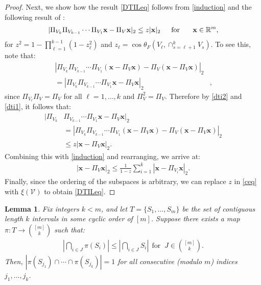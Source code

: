\documentclass[journal, twocolumn]{IEEEtran}
\newtheorem{lemma}{Lemma}
\begin{document}
\begin{proof}
Next, we show how the result \eqref{DTILeq} follows from \eqref{induction} and the following result of \cite[Theorem 9.33]{Deutsch12}:
\begin{align}\label{dti2}
|\Pi_{V_k}\Pi_{V_{k-1}}\cdots\Pi_{V_1} \mathbf{x} - \Pi_V\mathbf{x}|_2 \leq z |\mathbf{x}|_2 \indent \text{for } \indent \mathbf{x} \in \mathbb{R}^m,
\end{align}
for \mbox{$z^2= 1 - \prod_{\ell =1}^{k-1}(1-z_{\ell}^2)$} and \mbox{$z_{\ell} = \cos\theta_F\left(V_{\ell}, \cap_{s=\ell+1}^k V_s\right)$}. 
To see this, note that:
\begin{align}\label{dti1}
|\Pi_{V_k}\Pi_{V_{k-1}}\cdots\Pi_{V_1}(\mathbf{x} - \Pi_V\mathbf{x}) - \Pi_V(\mathbf{x} - \Pi_V\mathbf{x})|_2& \\
= |\Pi_{V_k}\Pi_{V_{k-1}}\cdots\Pi_{V_1} \mathbf{x} - \Pi_V \mathbf{x} |_2&,
\end{align}
since $\Pi_{V_\ell} \Pi_V = \Pi_V$ for all $\ell = 1, \ldots, k$ and $\Pi_V^2 = \Pi_V$.
Therefore by \eqref{dti2} and \eqref{dti1}, it follows that:
\begin{align*}
|\Pi_{V_k}&\Pi_{V_{k-1}}\cdots\Pi_{V_1} \mathbf{x} - \Pi_V \mathbf{x} |_2 \\
&= |\Pi_{V_k}\Pi_{V_{k-1}}\cdots\Pi_{V_1}(\mathbf{x} - \Pi_V\mathbf{x}) - \Pi_V(\mathbf{x} - \Pi_V\mathbf{x})|_2 \\
&\leq z |\mathbf{x} - \Pi_V\mathbf{x}|_2.
\end{align*}
Combining this with \eqref{induction} and rearranging, we arrive at:
\begin{align}\label{ceq}
|\mathbf{x} - \Pi_V \mathbf{x}|_2 \leq \frac{1}{1 - z} \sum_{i=1}^k |\mathbf{x} - \Pi_{V_i} \mathbf{x}|_2.
\end{align}
Finally, since the ordering of the subspaces is arbitrary, we can replace $z$ in \eqref{ceq} with $\xi(\mathcal{V})$ to obtain \eqref{DTILeq}.
\end{proof}


\begin{lemma}\label{NonEmptyLemma} Fix integers $k < m$, and let $T = \{S_1, \ldots, S_m\}$ be the set of contiguous length $k$ intervals in some cyclic order of $[m]$. Suppose there exists a map $\pi: T \to {[m] \choose k}$ such that:
\begin{align}\label{NonEmpty}
|\bigcap_{i \in J} \pi(S_i)| \leq |\bigcap_{i \in J} S_i | \ \ \text{for } \ J \in {[m] \choose k}.
\end{align}
%
Then, $|\pi(S_{j_1}) \cap \cdots \cap \pi(S_{j_k})| = 1$ for all consecutive (modulo $m$) indices $j_1,\ldots,j_k$.
\end{lemma}
\end{document}
